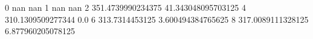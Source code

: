 0 nan nan
1 nan nan
2 351.4739990234375 41.343048095703125
4 310.1309509277344 0.0
6 313.7314453125 3.600494384765625
8 317.0089111328125 6.877960205078125
